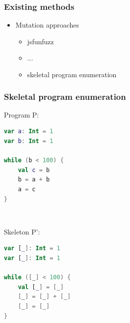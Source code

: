 
\begin{frame}
	\frametitle{Existing methods}
	\begin{itemize}
		\item Mutation approaches
			\begin{itemize}
				\item jsfunfuzz
				\item ...
				\item skeletal program enumeration
			\end{itemize}
	\end{itemize}
	
\end{frame}


\begin{frame}[fragile]
	\frametitle{Skeletal program enumeration}
\begin{minipage}{0.4\linewidth}
Program P:
		\begin{lstlisting}[language=Kotlin]
var a: Int = 1
var b: Int = 1

while (b < 100) {
    val c = b
    b = a + b
    a = c
}
 \end{lstlisting}
	\end{minipage}
	\begin{minipage}{0.1\linewidth}
	\ \ 
	\end{minipage}
	\begin{minipage}{0.4\linewidth}
Skeleton P':
		\begin{lstlisting}[language=Kotlin]
var [_]: Int = 1
var [_]: Int = 1

while ([_] < 100) {
    val [_] = [_]
    [_] = [_] + [_]
    [_] = [_]
}
	\end{lstlisting}
\end{minipage}
	
\end{frame}



